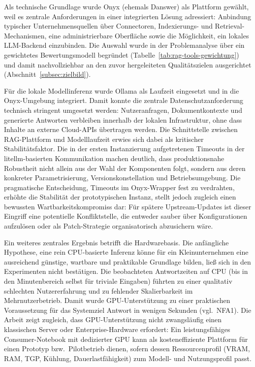Als technische Grundlage wurde Onyx (ehemals Danswer) als Plattform gewählt, weil es zentrale Anforderungen in einer integrierten Lösung adressiert: Anbindung typischer Unternehmensquellen über Connectoren, Indexierungs- und Retrieval-Mechanismen, eine administrierbare Oberfläche sowie die Möglichkeit, ein lokales LLM-Backend einzubinden.
Die Auswahl wurde in der Problemanalyse über ein gewichtetes Bewertungsmodell begründet (Tabelle~\ref{tab:rag-tools-gewichtung}) und damit nachvollziehbar an den zuvor hergeleiteten Qualitätszielen ausgerichtet (Abschnitt~\ref{subsec:zielbild}).

Für die lokale Modellinferenz wurde Ollama als Laufzeit eingesetzt und in die Onyx-Umgebung integriert.
Damit konnte die zentrale Datenschutzanforderung technisch stringent umgesetzt werden: Nutzeranfragen, Dokumentkontexte und generierte Antworten verbleiben innerhalb der lokalen Infrastruktur, ohne dass Inhalte an externe Cloud-APIs übertragen werden.
Die Schnittstelle zwischen RAG-Plattform und Modelllaufzeit erwies sich dabei als kritischer Stabilitätsfaktor.
Die in der ersten Instanzierung aufgetretenen Timeouts in der litellm-basierten Kommunikation machen deutlich, dass produktionsnahe Robustheit nicht allein aus der Wahl der Komponenten folgt, sondern aus deren konkreter Parametrisierung, Versionskonstellation und Betriebsumgebung.
Die pragmatische Entscheidung, Timeouts im Onyx-Wrapper fest zu verdrahten, erhöhte die Stabilität der prototypischen Instanz, stellt jedoch zugleich einen bewussten Wartbarkeitskompromiss dar: Für spätere Upstream-Updates ist dieser Eingriff eine potentielle Konfliktstelle, die entweder sauber über Konfigurationen aufzulösen oder als Patch-Strategie organisatorisch abzusichern wäre.

Ein weiteres zentrales Ergebnis betrifft die Hardwarebasis.
Die anfängliche Hypothese, eine rein CPU-basierte Inferenz könne für ein Kleinunternehmen eine ausreichend günstige, wartbare und praktikable Grundlage bilden, ließ sich in den Experimenten nicht bestätigen.
Die beobachteten Antwortzeiten auf CPU (bis in den Minutenbereich selbst für triviale Eingaben) führten zu einer qualitativ schlechten Nutzererfahrung und zu fehlender Skalierbarkeit im Mehrnutzerbetrieb.
Damit wurde GPU-Unterstützung zu einer praktischen Voraussetzung für das Systemziel \glqq Antwort in wenigen Sekunden\grqq{} (vgl.\ NFA1).
Die Arbeit zeigt zugleich, dass GPU-Unterstützung nicht zwangsläufig einen klassischen Server oder Enterprise-Hardware erfordert: Ein leistungsfähiges Consumer-Notebook mit dedizierter GPU kann als kosteneffiziente Plattform für einen Prototyp bzw.\ Pilotbetrieb dienen, sofern dessen Ressourcenprofil (VRAM, RAM, TGP, Kühlung, Dauerlastfähigkeit) zum Modell- und Nutzungsprofil passt.

